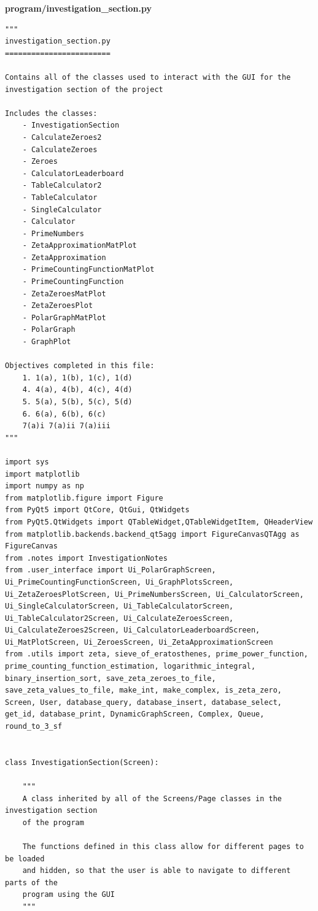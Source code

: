 \documentclass[12pt]{article}
\begin{document}
\textbf{program/investigation\_section.py}

\begin{lstlisting}
"""
investigation_section.py
========================

Contains all of the classes used to interact with the GUI for the
investigation section of the project

Includes the classes:
    - InvestigationSection
    - CalculateZeroes2
    - CalculateZeroes
    - Zeroes
    - CalculatorLeaderboard
    - TableCalculator2
    - TableCalculator
    - SingleCalculator
    - Calculator
    - PrimeNumbers
    - ZetaApproximationMatPlot
    - ZetaApproximation
    - PrimeCountingFunctionMatPlot
    - PrimeCountingFunction
    - ZetaZeroesMatPlot
    - ZetaZeroesPlot
    - PolarGraphMatPlot
    - PolarGraph
    - GraphPlot

Objectives completed in this file:
    1. 1(a), 1(b), 1(c), 1(d)
    4. 4(a), 4(b), 4(c), 4(d)
    5. 5(a), 5(b), 5(c), 5(d)
    6. 6(a), 6(b), 6(c)
    7(a)i 7(a)ii 7(a)iii
"""

import sys
import matplotlib
import numpy as np
from matplotlib.figure import Figure
from PyQt5 import QtCore, QtGui, QtWidgets
from PyQt5.QtWidgets import QTableWidget,QTableWidgetItem, QHeaderView
from matplotlib.backends.backend_qt5agg import FigureCanvasQTAgg as FigureCanvas
from .notes import InvestigationNotes
from .user_interface import Ui_PolarGraphScreen, Ui_PrimeCountingFunctionScreen, Ui_GraphPlotsScreen, Ui_ZetaZeroesPlotScreen, Ui_PrimeNumbersScreen, Ui_CalculatorScreen, Ui_SingleCalculatorScreen, Ui_TableCalculatorScreen, Ui_TableCalculator2Screen, Ui_CalculateZeroesScreen, Ui_CalculateZeroes2Screen, Ui_CalculatorLeaderboardScreen, Ui_MatPlotScreen, Ui_ZeroesScreen, Ui_ZetaApproximationScreen
from .utils import zeta, sieve_of_eratosthenes, prime_power_function, prime_counting_function_estimation, logarithmic_integral, binary_insertion_sort, save_zeta_zeroes_to_file, save_zeta_values_to_file, make_int, make_complex, is_zeta_zero, Screen, User, database_query, database_insert, database_select, get_id, database_print, DynamicGraphScreen, Complex, Queue, round_to_3_sf


class InvestigationSection(Screen):

    """
    A class inherited by all of the Screens/Page classes in the investigation section
    of the program

    The functions defined in this class allow for different pages to be loaded
    and hidden, so that the user is able to navigate to different parts of the
    program using the GUI
    """


\end{lstlisting}
\end{document}
